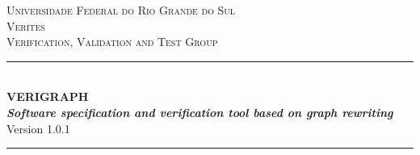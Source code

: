 \documentclass[12pt]{article}
\newcommand{\verigraphversion}{1.0.1}
\begin{document}
\begin{titlepage}

\newcommand{\HRule}{\rule{\linewidth}{0.5mm}} %

\center %
 

\textsc{\normalsize Universidade Federal do Rio Grande do Sul}\\[1.0cm] %
\textsc{\Large Verites}\\[0.2cm] %
\textsc{\large Verification, Validation and Test Group}\\[0.2cm] %


\HRule \\[0.4cm]
{ \huge \bfseries \LARGE{VERIGRAPH} \\ [1.0cm]
\emph{\large{Software specification and verification tool based on graph rewriting}}
}\\[0.5cm]

Version \verigraphversion \\[0.4cm] %
\HRule \\[1.0cm]
 




\end{titlepage}
\end{document}
